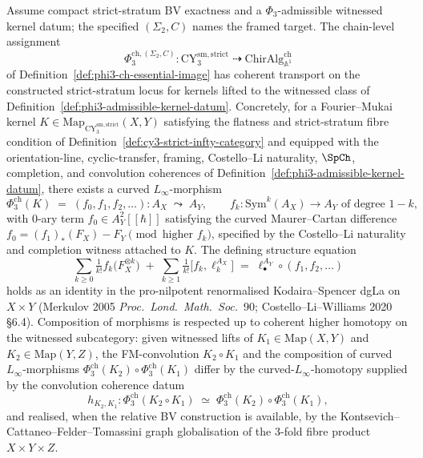 \begin{theorem}
\label{thm:phi3-ch-chain-level-functoriality}
Assume compact strict-stratum BV exactness and a
$\Phi_3$-admissible witnessed kernel datum; the specified
$(\Sigma_2,C)$ names the framed target.
The chain-level assignment
\[
 \Phi_3^{\mathrm{ch},(\Sigma_2,C)} \colon \mathrm{CY}_3^{\mathrm{sm,strict}} \;\dashrightarrow\; \mathrm{ChirAlg}^{\mathrm{ch}}_{\mathbb{A}^1}
\]
of Definition~\ref{def:phi3-ch-essential-image} has coherent transport on the constructed strict-stratum locus for kernels lifted to the witnessed class of Definition~\ref{def:phi3-admissible-kernel-datum}. Concretely, for a Fourier--Mukai kernel $K \in \mathrm{Map}_{\mathrm{CY}_3^{\mathrm{sm,strict}}}(X, Y)$ satisfying the flatness and strict-stratum fibre condition of Definition~\ref{def:cy3-strict-infty-category} and equipped with the orientation-line, cyclic-transfer, framing, Costello--Li naturality, $\SpCh$, completion, and convolution coherences of Definition~\ref{def:phi3-admissible-kernel-datum}, there exists a curved $L_\infty$-morphism
\[
 \Phi_3^{\mathrm{ch}}(K) \;=\; (f_0, f_1, f_2, \ldots) \colon A_X \;\leadsto\; A_Y, \qquad f_k \colon \mathrm{Sym}^k(A_X) \to A_Y \text{ of degree } 1 - k,
\]
with $0$-ary term $f_0 \in A_Y^2[\![\hbar]\!]$ satisfying the curved Maurer--Cartan difference $f_0 = (f_1)_*(F_X) - F_Y \pmod{\text{higher } f_k}$, specified by the Costello--Li naturality and completion witness attached to $K$. The defining structure equation
\begin{equation}
\label{eq:curved-Linfty-morphism-equation}
 \sum_{k \geq 0} \tfrac{1}{k!} f_k\bigl(F_X^{\otimes k}\bigr) \;+\; \sum_{k \geq 1} \tfrac{1}{k!}\bigl[f_k, \ell_k^{A_X}\bigr] \;=\; \ell_\bullet^{A_Y} \circ (f_1, f_2, \ldots)
\end{equation}
holds as an identity in the pro-nilpotent renormalised Kodaira--Spencer dgLa on $X \times Y$ (Merkulov 2005 \textit{Proc.~Lond.~Math.~Soc.}~90; Costello--Li--Williams 2020 \S6.4). Composition of morphisms is respected up to coherent higher homotopy on the witnessed subcategory: given witnessed lifts of $K_1 \in \mathrm{Map}(X, Y)$ and $K_2 \in \mathrm{Map}(Y, Z)$, the FM-convolution $K_2 \circ K_1$ and the composition of curved $L_\infty$-morphisms $\Phi_3^{\mathrm{ch}}(K_2) \circ \Phi_3^{\mathrm{ch}}(K_1)$ differ by the curved-$L_\infty$-homotopy supplied by the convolution coherence datum
\[
 h_{K_2, K_1} \colon \Phi_3^{\mathrm{ch}}(K_2 \circ K_1) \;\simeq\; \Phi_3^{\mathrm{ch}}(K_2) \circ \Phi_3^{\mathrm{ch}}(K_1),
\]
and realised, when the relative BV construction is available, by the Kontsevich--Cattaneo--Felder--Tomassini graph globalisation of the $3$-fold fibre product $X \times Y \times Z$.
\end{theorem}

